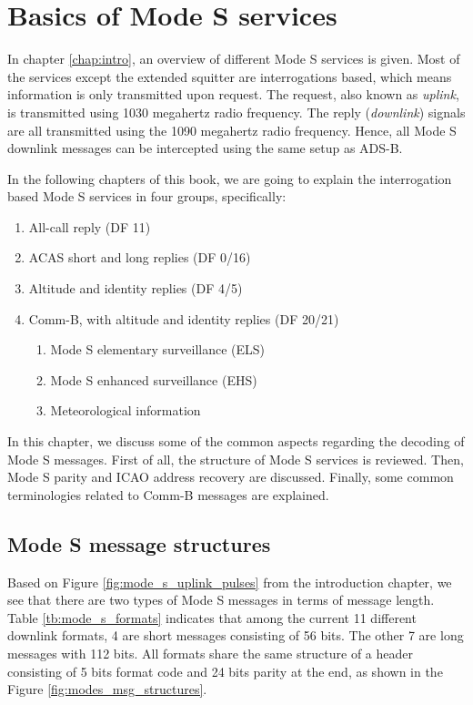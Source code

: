 \chapter{Basics of Mode S services} \label{chap:mode_s_basics}

In chapter \ref{chap:intro}, an overview of different Mode S services is given. Most of the services except the extended squitter are interrogations based, which means information is only transmitted upon request. The request, also known as \emph{uplink}, is transmitted using 1030 megahertz radio frequency. The reply (\emph{downlink}) signals are all transmitted using the 1090 megahertz radio frequency. Hence, all Mode S downlink messages can be intercepted using the same setup as ADS-B.

In the following chapters of this book, we are going to explain the interrogation based Mode S services in four groups, specifically:

\begin{enumerate}
  \item All-call reply (DF 11)
  \item ACAS short and long replies (DF 0/16)
  \item Altitude and identity replies (DF 4/5)
  \item Comm-B, with altitude and identity replies (DF 20/21)
    \begin{enumerate}
      \item Mode S elementary surveillance (ELS)
      \item Mode S enhanced surveillance (EHS)
      \item Meteorological information
    \end{enumerate}
\end{enumerate}

In this chapter, we discuss some of the common aspects regarding the decoding of Mode S messages. First of all, the structure of Mode S services is reviewed. Then, Mode S parity and ICAO address recovery are discussed. Finally, some common terminologies related to Comm-B messages are explained.


\section{Mode S message structures}

Based on Figure \ref{fig:mode_s_uplink_pulses} from the introduction chapter, we see that there are two types of Mode S messages in terms of message length. Table \ref{tb:mode_s_formats} indicates that among the current 11 different downlink formats, 4 are short messages consisting of 56 bits. The other 7 are long messages with 112 bits. All formats share the same structure of a header consisting of 5 bits format code and 24 bits parity at the end, as shown in the Figure \ref{fig:modes_msg_structures}.

